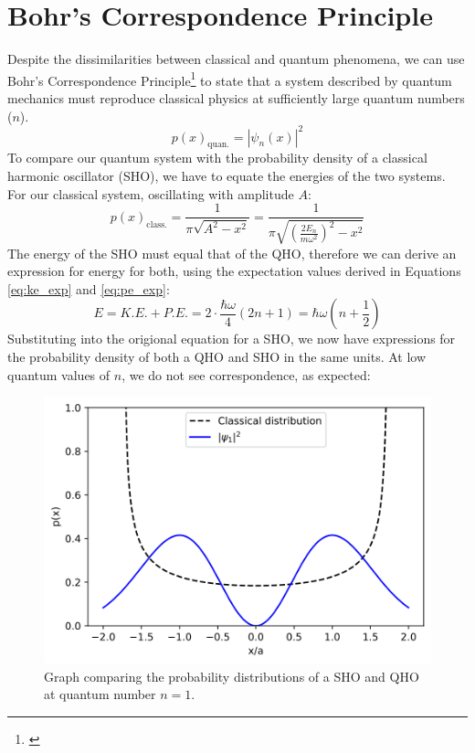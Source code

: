 \documentclass[a4paper]{article}
\begin{document}
\section{Bohr's Correspondence Principle} \label{section:bohr}
Despite the dissimilarities between classical and quantum phenomena, we can use Bohr's Correspondence Principle\footnote{\cite{1605.08202}} to state that a system described by quantum mechanics must reproduce classical physics at sufficiently large quantum numbers ($n$). 
\begin{equation}
p(x)_\text{quan.}=|\psi_n(x)|^2
\end{equation}
To compare our quantum system with the probability density of a classical harmonic oscillator (SHO), we have to equate the energies of the two systems. For our classical system, oscillating with amplitude $A$:
\begin{equation}
p(x)_\text{class.}=\frac1{\pi\sqrt{A^2-x^2}}=\frac1{\pi\sqrt{(\frac{2E_n}{m\omega^2})^2-x^2}}
\end{equation}
The energy of the SHO must equal that of the QHO, therefore we can derive an expression for energy for both, using the expectation values derived in Equations \ref{eq:ke_exp} and \ref{eq:pe_exp}:
\begin{equation}
E=K.E.+P.E.=2\cdot\frac{\hbar\omega}4(2n+1)=\hbar\omega(n+\frac12)
\end{equation}
Substituting into the origional equation for a SHO, we now have expressions for the probability density of both a QHO and SHO in the same units. At low quantum values of $n$, we do not see correspondence, as expected:
\begin{figure}[h!]
  \centerline{\includegraphics[scale=0.7]{n1.png}}
  \caption{Graph comparing the probability distributions of a SHO and QHO at quantum number $n=1$.}
  \label{fig:n1}
\end{figure}
\end{document}
